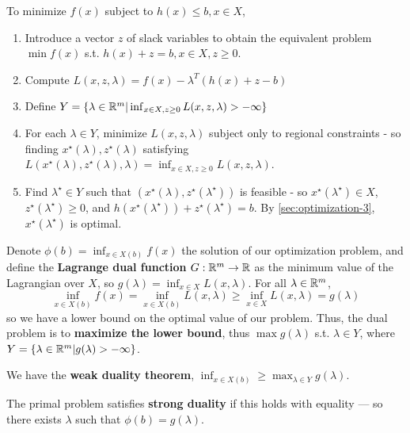 \begin{thm}
  \label{sec:optimization-4}
  To minimize $f(x)$ subject to $h(x) \leq b, x \in X$,
  \begin{enumerate}
  \item Introduce a vector $z$ of slack variables to obtain the
    equivalent problem $\min f(x)$ s.t. $h(x) + z = b, x \in X, z \geq
    0$.
  \item Compute $L(x, z, \lambda) = f(x) - \lambda^{T}(h(x) + z - b)$
  \item Define $Y = \{ \lambda \in \mathbb{R}^{m} | \inf_{x \in X, z \geq 0}
    L(x, z, \lambda) > -\infty \} $
  \item For each $\lambda \in Y$, minimize $L(x, z, \lambda)$ subject
    only to regional constraints - so finding $x^{\star}(\lambda),
    z^{\star}(\lambda)$ satisfying $L(x^{\star}(\lambda),
    z^{\star}(\lambda), \lambda) = \inf_{x \in X, z \geq 0} L(x, z,
    \lambda)$.
  \item Find $\lambda^{\star} \in Y$ such that $(x^{\star}(\lambda),
    z^{\star}(\lambda^{\star}))$ is feasible - so
    $x^{\star}(\lambda^{\star}) \in X$, $z^{\star}(\lambda^{\star})
    \geq 0$, and $h(x^{\star}(\lambda^{\star})) +
    z^{\star}(\lambda^{\star}) = b$.  By \ref{sec:optimization-3},
    $x^{\star}(\lambda^{\star})$ is optimal.
  \end{enumerate}
\end{thm}

\begin{defn}
  \label{sec:optimization-5}
  Denote $\phi(b) = \inf_{x \in X(b)}f(x)$ the solution of our
  optimization problem, and define the \textbf{Lagrange dual function}
  $G: \mathbb{R}^{m} \rightarrow \mathbb{R}$ as the minimum value of the Lagrangian
  over $X$, so $g(\lambda) = \inf_{x \in X} L(x, \lambda)$. For all
  $\lambda \in \mathbb{R}^{m}$,
  \begin{equation}
    \label{eq:2}
    \inf_{x \in X(b)} f(x) = \inf_{x \in X(b)} L(x, \lambda) \geq
    \inf_{x \in X} L(x, \lambda) = g(\lambda)
  \end{equation}
  so we have a lower bound on the optimal value of our problem.  Thus,
  the dual problem is to \textbf{maximize the lower bound}, thus $\max
  g(\lambda)$ s.t. $\lambda \in Y$, where $Y = \{ \lambda \in \mathbb{R}^{m} |
g(\lambda) > -\infty \} $.
\end{defn}

\begin{thm}
  \label{sec:optimization-6}
  We have the \textbf{weak duality theorem},
  $\inf_{x \in X(b)} \geq \max_{\lambda \in Y} g(\lambda)$.

  The primal problem satisfies \textbf{strong duality} if this holds
  with equality --- so there exists $\lambda$ such that $\phi(b) = g(\lambda)$.
\end{thm}

